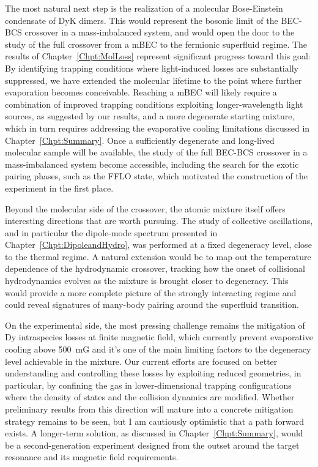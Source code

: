The most natural next step is the realization of a molecular Bose-Einstein condensate of DyK dimers. This would represent the bosonic limit of the \ac{BEC}-\ac{BCS} crossover in a mass-imbalanced system, and would open the door to the study of the full crossover from a \ac{mBEC} to the fermionic superfluid regime. The results of Chapter~\ref{Chpt:MolLoss} represent significant progress toward this goal: By identifying trapping conditions where light-induced losses are substantially suppressed, we have extended the molecular lifetime to the point where further evaporation becomes conceivable. Reaching a \ac{mBEC} will likely require a combination of improved trapping conditions exploiting longer-wavelength light sources, as suggested by our results, and a more degenerate starting mixture, which in turn requires addressing the evaporative cooling limitations discussed in Chapter~\ref{Chpt:Summary}. Once a sufficiently degenerate and long-lived molecular sample will be available, the study of the full \ac{BEC}-\ac{BCS} crossover in a mass-imbalanced system become accessible, including the search for the exotic pairing phases, such as the \ac{FFLO} state, which motivated the construction of the experiment in the first place.

Beyond the molecular side of the crossover, the atomic mixture itself offers interesting directions that are worth pursuing. The study of  collective oscillations, and in particular the dipole-mode spectrum presented  in Chapter~\ref{Chpt:DipoleandHydro}, was performed at a fixed degeneracy level, close to the thermal regime. A natural extension would be to map out the temperature dependence of the hydrodynamic crossover, tracking how the onset of collisional hydrodynamics evolves as the mixture is brought closer to degeneracy. This would provide a more complete picture of the strongly interacting regime and could reveal signatures of many-body pairing around the superfluid transition.

On the experimental side, the most pressing challenge remains the mitigation of Dy intraspecies losses at finite magnetic field, which currently prevent evaporative cooling above \SI{500}{mG} and it's one of the main limiting factors to the degeneracy level achievable in the mixture. Our current efforts are focused on better understanding and controlling these losses by exploiting reduced geometries, in particular, by confining the gas in lower-dimensional trapping configurations where the density of states and the collision dynamics are modified. Whether preliminary results from this direction will mature into a concrete mitigation strategy remains to be seen, but I am cautiously optimistic that a path forward exists. A longer-term solution, as discussed in Chapter~\ref{Chpt:Summary}, would be a second-generation experiment designed from the outset around the target resonance and its magnetic field requirements.


